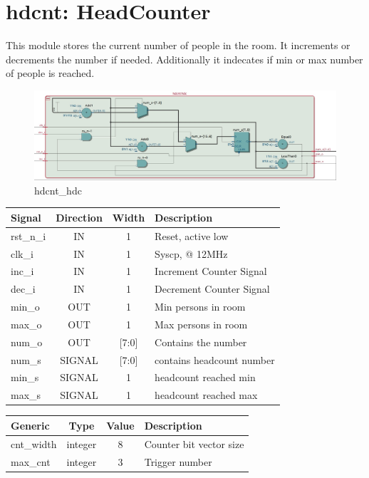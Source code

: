\documentclass[12pt,a4 paper] {report}
\begin{document}
\section{hdcnt: HeadCounter}
This module stores the current number of people in the room. It increments or decrements the number if needed. 
Additionally it indecates if min or max number of people is reached.
\begin{figure}[h]
	\centering	
	\includegraphics[scale=0.3]{../png/hdcnt_hdc.png}
	\caption{hdcnt\_hdc}
\end{figure}
\begin{center}
	\begin{tabular}{ | p{2cm} | c | c | p{5cm} |}
		\hline
		\textbf{Signal} & \textbf{Direction} & \textbf{Width} & \textbf{Description} \\
		\hline
		\hline
		rst\_n\_i & IN & 1 & Reset, active low \\
		\hline
		clk\_i & IN & 1 & Syscp, @ 12MHz \\
		\hline
		inc\_i & IN & 1 & Increment Counter Signal \\
		\hline
		dec\_i & IN & 1 & Decrement Counter Signal \\
		\hline
		min\_o & OUT & 1 & Min persons in room \\
		\hline
		max\_o & OUT & 1 & Max persons in room \\
		\hline
		num\_o & OUT & [7:0] & Contains the number \\
		\hline
		\hline
		num\_s & SIGNAL & [7:0] & contains headcount number\\
		\hline
		min\_s & SIGNAL & 1 & headcount reached min\\
		\hline
		max\_s & SIGNAL & 1 & headcount reached max\\
		\hline
	\end{tabular}
\end{center}
\begin{center}
	\begin{tabular}{| p{2cm} | c | c | p{5cm} |}
		\hline
		\textbf{Generic} & \textbf{Type} & \textbf{Value} & \textbf{Description} \\
		\hline
		cnt\_width & integer & 8 & Counter bit vector size  \\
		\hline
		max\_cnt & integer & 3 & Trigger number \\
		\hline
	\end{tabular}	
\end{center}
\end{document}
